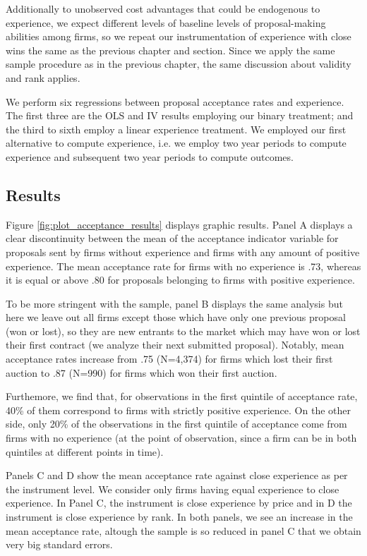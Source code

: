 Additionally to unobserved cost advantages that could be endogenous to experience, we expect different levels of baseline levels of proposal-making abilities among firms, so we repeat our instrumentation of experience with close wins the same as the previous chapter and section. Since we apply the same sample procedure as in the previous chapter, the same discussion about validity and rank applies.

We perform six regressions between proposal acceptance rates and experience. The first three are the OLS and IV results employing our binary treatment; and the third to sixth employ a linear experience treatment. We employed our first alternative to compute experience, i.e. we employ two year periods to compute experience and subsequent two year periods to compute outcomes.

\subsection{Results}
Figure \ref{fig:plot_acceptance_results} displays graphic results. Panel A displays a clear discontinuity between the mean of the acceptance indicator variable for proposals sent by firms without experience and firms with any amount of positive experience. The mean acceptance rate for firms with no experience is .73, whereas it is equal or above .80 for proposals belonging to firms with positive experience.

To be more stringent with the sample, panel B displays the same analysis but here we leave out all firms except those which have only one previous proposal (won or lost), so they are new entrants to the market which may have won or lost their first contract (we analyze their next submitted proposal).  Notably, mean acceptance rates increase from .75 (N=4,374) for firms which lost their first auction to .87 (N=990) for firms which won their first auction.

Furthemore, we find that, for observations in the first quintile of acceptance rate, 40\% of them correspond to firms with strictly positive experience. On the other side, only 20\% of the observations in the first quintile of acceptance come from firms with no experience (at the point of observation, since a firm can be in both quintiles at different points in time).

Panels C and D show the mean acceptance rate against close experience as per the instrument level. We consider only firms having equal experience to close experience. In Panel C, the instrument is close experience by price and in D the instrument is close experience by rank. In both panels, we see an increase in the mean acceptance rate, altough the sample is so reduced in panel C that we obtain very big standard errors.

